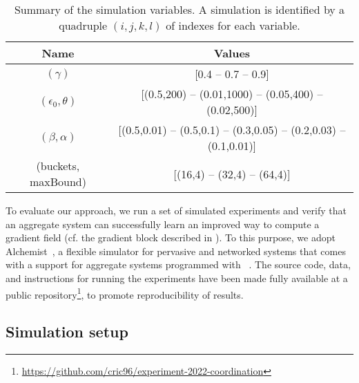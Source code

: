 \begin{table}[t]
  \centering
  \begin{tabular}{|c|c|}
    \hline
    Name &  Values \\ \hline
    $(\gamma)$ & [0.4 -- 0.7 -- 0.9] \\  \hline
    $(\epsilon_0, \theta)$ & [(0.5,200) -- (0.01,1000) -- (0.05,400) -- (0.02,500)] \\ \hline
    $(\beta, \alpha)$ & [(0.5,0.01) -- (0.5,0.1) -- (0.3,0.05) -- (0.2,0.03) -- (0.1,0.01)]
    \\  \hline
    (buckets, maxBound) & [(16,4) -- (32,4) -- (64,4)]\\ \hline
  \end{tabular}
  \caption{Summary of the simulation variables. 
  A simulation is identified by a quadruple $(i, j, k, l)$ of indexes for each variable. 
  }
  \label{coordination2022:table:parameters}
\end{table}

To evaluate our approach, we run a set of simulated experiments and verify that an aggregate system
 can successfully learn an improved way to compute a gradient field (cf. the gradient block described in ).
%
To this purpose, we adopt Alchemist~\cite{DBLP:journals/jos/PianiniMV13},
 a flexible simulator 
 for pervasive and networked systems
 that comes with a support for aggregate systems 
 programmed with \scafi{}~\cite{DBLP:conf/isola/CasadeiVAD20}. 
%
The source code, data, and instructions for running the experiments have been made fully available at a public repository\footnote{\url{https://github.com/cric96/experiment-2022-coordination}}, to promote reproducibility of results.

\subsection{Simulation setup}

